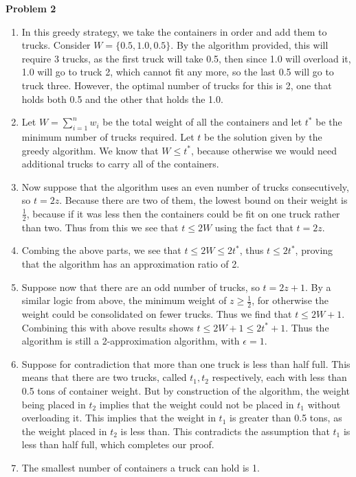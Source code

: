 \documentclass{article}
\newcommand{\Problem}[1]{\textbf{\large Problem #1}}
\begin{document}
\Problem{2}

\begin{enumerate}
\item In this greedy strategy, we take the containers in order and add them to trucks. 
Consider $W = \{0.5, 1.0, 0.5\}$.
By the algorithm provided, this will require 3 trucks, as the first truck will take 0.5, then since 1.0 will overload it, 1.0 will go to truck 2, which cannot fit any more, so the last 0.5 will go to truck three.
However, the optimal number of trucks for this is 2, one that holds both 0.5 and the other that holds the 1.0.	
\item Let $W = \sum_{i=1}^n w_i$ be the total weight of all the containers and let $t^*$ be the minimum number of trucks required. 
Let $t$ be the solution given by the greedy algorithm. 
We know that $W \leq t^*$, because otherwise we would need additional trucks to carry all of the containers. 
\item Now suppose that the algorithm uses an even number of trucks consecutively, so $t = 2z$.
Because there are two of them, the lowest bound on their weight is $\frac{1}{2}$, because if it was less then the containers could be fit on one truck rather than two.  
Thus from this we see that $t \leq 2W$ using the fact that $t = 2z$. 
\item Combing the above parts, we see that $t \leq 2W \leq 2t^*$, thus $t \leq 2t^*$, proving that the algorithm has an approximation ratio of 2. 
\item Suppose now that there are an odd number of trucks, so $t = 2z + 1$. 
By a similar logic from above, the minimum weight of $z \geq \frac{1}{2}$, for otherwise the weight could be consolidated on fewer trucks. 
Thus we find that $t \leq 2W + 1$.
Combining this with above results shows $t \leq 2W + 1 \leq 2t^* + 1$.
Thus the algorithm is still a 2-approximation algorithm, with $\epsilon = 1$. 
\item Suppose for contradiction that more than one truck is less than half full.
This means that there are two trucks, called $t_1,t_2$ respectively, each with less than 0.5 tons of container weight. 
But by construction of the algorithm, the weight being placed in $t_2$ implies that the weight could not be placed in $t_1$ without overloading it. 
This implies that the weight in $t_1$ is greater than 0.5 tons, as the weight placed in $t_2$ is less than.
This contradicts the assumption that $t_1$ is less than half full, which completes our proof.
\item The smallest number of containers a truck can hold is 1. 

\end{enumerate}
\end{document}
